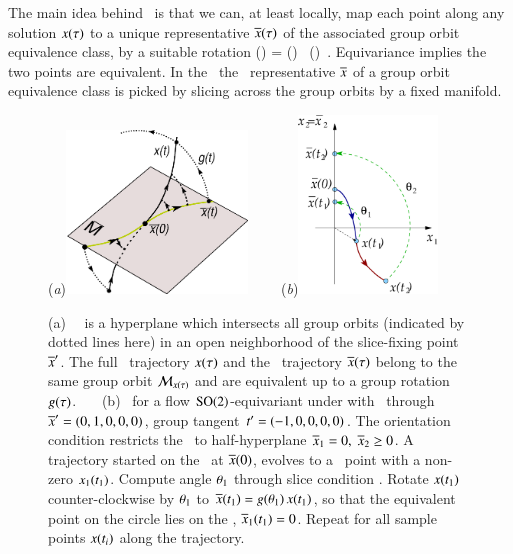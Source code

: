 \documentclass[preprint,number,sort&compress]{elsarticle}
\begin{document}
The main idea behind \mframes\ is that we can, at least locally,
map each point along any solution $x(\tau)$ to a unique
representative $\overline{x}(\tau)$ of the associated
group orbit equivalence class, by a suitable rotation
\beq
\ssp(\tau) = \LieEl(\tau) \, \sspRed(\tau)
\,.
Equivariance implies the two points are equivalent. In the
\mframes\ the \reducedsp\ representative $\overline{x}$ of a
group orbit equivalence class is picked by slicing across the
group orbits by a fixed manifold.
%
\begin{figure}[ht]
\begin{center}
(\textit{a})\includegraphics[width=0.43\textwidth,clip=true]{ReducTraj1}
~~~~(\textit{b})\includegraphics[width=0.33\textwidth,clip=true]{ESunrot}
\end{center}
\caption{
(a)
\Slice\ \pSRed\ is a hyperplane  which intersects
all
group orbits (indicated by dotted lines here) in an open
neighborhood of the slice-fixing point ${\overline{x}'}$. The full
\statesp\ trajectory $x(\tau)$ and the \reducedsp\
trajectory $\overline{x}(\tau)$ belong to the same group orbit
${\cal M}_{x(\tau)}$ and are equivalent up to a group rotation
$g(\tau)$.
~~~(b)
\Mframes\ for a flow $\textrm{SO}(2)$-equi\-vari\-ant under
 with \slice\ through ${\overline{x}'}=(0,1,0,0,0)$,
group tangent $t'_{}=(-1,0,0,0,0)$. The
orientation condition restricts the \slice\ to half-hyperplane
$\overline{x}_1=0,\;\overline{x}_2\ge 0$. A trajectory started on the
\slice\ at $\overline{x}(0)$, evolves to a \statesp\ point with a
non-zero $x_1(t_1)$. Compute angle ${\bf \theta}_1$
through slice condition . Rotate $x(t_1)$
counter-clockwise by ${\bf \theta}_1$ to $\overline{x}(t_1) =
g({\bf \theta}_1)\,x(t_1)$, so that the equivalent point
on the circle lies on the \slice, $\overline{x}_1(t_1) =0$. Repeat
for all sample points $x(t_i)$ along the trajectory.
}\label{fig:ReducTraj}
\end{figure}
%
\end{document}
